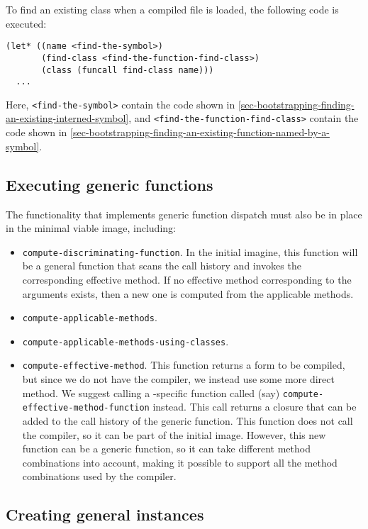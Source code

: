 To find an existing class when a compiled file is loaded, the
following code is executed:

\begin{verbatim}
(let* ((name <find-the-symbol>)
       (find-class <find-the-function-find-class>)
       (class (funcall find-class name)))
  ...
\end{verbatim}

Here, \texttt{<find-the-symbol>} contain the code shown in
\ref{sec-bootstrapping-finding-an-existing-interned-symbol}, and
\texttt{<find-the-function-find-class>} contain the code shown in
\ref{sec-bootstrapping-finding-an-existing-function-named-by-a-symbol}.

\subsection{Executing generic functions}
\label{sec-bootstrapping-executing-generic-functions}

The functionality that implements generic function dispatch must also
be in place in the minimal viable image, including:

\begin{itemize}
\item \texttt{compute-discriminating-function}.  In the initial
  imagine, this function will be a general function that scans the
  call history and invokes the corresponding effective method.  If no
  effective method corresponding to the arguments exists, then a new
  one is computed from the applicable methods.
\item \texttt{compute-applicable-methods}.
\item \texttt{compute-applicable-methods-using-classes}.
\item \texttt{compute-effective-method}.  This function returns a form
  to be compiled, but since we do not have the compiler, we instead
  use some more direct method.  We suggest calling a
  \sysname{}-specific function called (say)
  \texttt{compute-effective-method-function} instead.  This call
  returns a closure that can be added to the call history of the
  generic function.  This function does not call the compiler, so it
  can be part of the initial image.  However, this new function can be
  a generic function, so it can take different method combinations
  into account, making it possible to support all the method
  combinations used by the compiler.
\end{itemize}

\subsection{Creating general instances}
\label{sec-bootstrapping-creating-general-instances}

